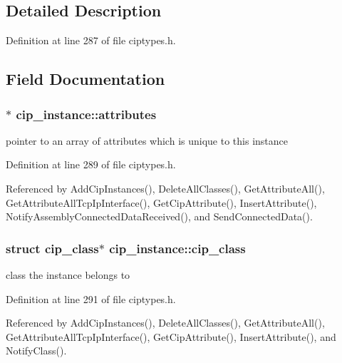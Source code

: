 \subsection{\-Detailed \-Description}


\-Definition at line 287 of file ciptypes.\-h.



\subsection{\-Field \-Documentation}
\hypertarget{structcip__instance_ada5c4109b95cb6635f4aa32a2e6d74bf}{
\subsubsection[{attributes}]{$\ast$ {\bf cip\-\_\-instance\-::attributes}}}\label{d5/dc5/structcip__instance_ada5c4109b95cb6635f4aa32a2e6d74bf}
pointer to an array of attributes which is unique to this instance 

\-Definition at line 289 of file ciptypes.\-h.



\-Referenced by \-Add\-Cip\-Instances(), \-Delete\-All\-Classes(), \-Get\-Attribute\-All(), \-Get\-Attribute\-All\-Tcp\-Ip\-Interface(), \-Get\-Cip\-Attribute(), \-Insert\-Attribute(), \-Notify\-Assembly\-Connected\-Data\-Received(), and \-Send\-Connected\-Data().

\hypertarget{structcip__instance_a62fb5c9eb145e33e6435b77734344f1e}{
\subsubsection[{cip\-\_\-class}]{\setlength{\rightskip}{0pt plus 5cm}struct {\bf cip\-\_\-class}$\ast$ {\bf cip\-\_\-instance\-::cip\-\_\-class}}}\label{d5/dc5/structcip__instance_a62fb5c9eb145e33e6435b77734344f1e}
class the instance belongs to 

\-Definition at line 291 of file ciptypes.\-h.



\-Referenced by \-Add\-Cip\-Instances(), \-Delete\-All\-Classes(), \-Get\-Attribute\-All(), \-Get\-Attribute\-All\-Tcp\-Ip\-Interface(), \-Get\-Cip\-Attribute(), \-Insert\-Attribute(), and \-Notify\-Class().

